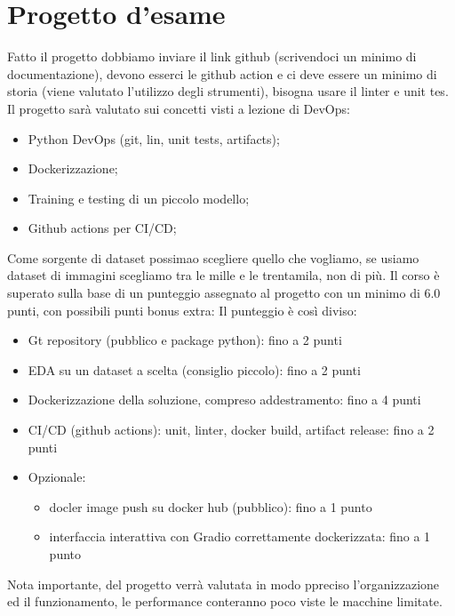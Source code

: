 \documentclass[a4paper,12pt]{article}
\begin{document}
\section{Progetto d'esame}
Fatto il progetto dobbiamo inviare il link github (scrivendoci un minimo di documentazione), devono esserci le github action e ci deve essere un minimo di storia (viene valutato l'utilizzo degli strumenti), bisogna usare il linter e unit tes.
Il progetto sarà valutato sui concetti visti a lezione di DevOps:
\begin{itemize}
    \item Python DevOps (git, lin, unit tests, artifacts);
    \item Dockerizzazione; 
    \item Training e testing di un piccolo modello;
    \item Github actions per CI/CD;
\end{itemize}
Come sorgente di dataset possimao scegliere quello che vogliamo, se usiamo dataset di immagini scegliamo tra le mille e le trentamila, non di più.
\newline
Il corso è superato sulla base di un punteggio assegnato al progetto con un minimo di 6.0 punti, con possibili punti bonus extra:
Il punteggio è così diviso:
\begin{itemize}
    \item Gt repository (pubblico e package python): fino a 2 punti
    \item EDA su un dataset a scelta (consiglio piccolo): fino a 2 punti
    \item Dockerizzazione della soluzione, compreso addestramento: fino a 4 punti 
    \item CI/CD (github actions): unit, linter, docker build, artifact release: fino a 2 punti
    \item Opzionale:
    \begin{itemize}
        \item docler image push su docker hub (pubblico): fino a 1 punto 
        \item interfaccia interattiva con Gradio correttamente dockerizzata: fino a 1 punto
    \end{itemize}
\end{itemize}
Nota importante, del progetto verrà valutata in modo ppreciso l'organizzazione ed il funzionamento, le performance conteranno poco viste le macchine limitate.
\end{document}
